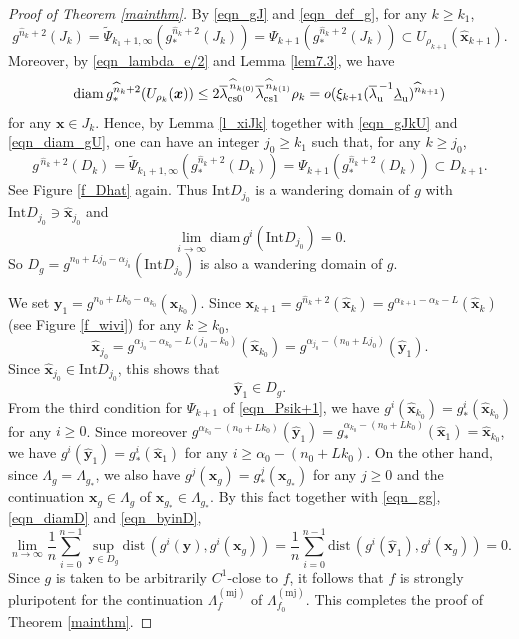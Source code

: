 \documentclass{amsart}
\theoremstyle{plain}
\theoremstyle{definition}
\numberwithin{equation}{section}
\numberwithin{figure}{section}
\def\bx{{\boldsymbol{x}}}
\def\by{{\boldsymbol{y}}}
\def\wh{\widehat}
\def\wt{\widetilde}
\def\ul{\underline}
\def\ol{\overline}
\def\ru{{\mathrm{u}}}
\begin{document}
\begin{proof}[Proof of Theorem \ref{mainthm}]
By \eqref{eqn_gJ} and \eqref{eqn_def_g}, for any $k\geq k_1$, 
\begin{equation}\label{eqn_gJkU}
g^{\wh n_k+2}(J_k)=\wt\varPsi_{k_1+1,\infty}(g_*^{\wh n_k+2}(J_k))=
\varPsi_{k+1}(g_*^{\wh n_k+2}(J_k))\subset  U_{\rho_{k+1}}(\wh\bx_{k+1}) .
\end{equation}
Moreover, by \eqref{eqn_lambda_e/2} and Lemma \ref{lem7.3}, we have  
\begin{equation}\label{eqn_diam_gU}
\mathrm{diam}\,g_*^{\wh n_k+2}(U_{\rho_k}(\bx))
\leq 2\ol\lambda_{\rm cs0}^{\,\widehat n_{k(0)}}\ol\lambda_{\rm cs1}^{\,\widehat n_{k(1)}}\rho_{k}
=o(\xi_{k+1}(\ol\lambda_{\ru}^{\,-1}\ul\lambda_{\ru})^{\wh n_{k+1}})
\end{equation}
for any $\bx\in J_k$.
Hence, by Lemma \ref{l_xiJk} together with \eqref{eqn_gJkU} and \eqref{eqn_diam_gU}, 
one can  have an integer $j_0\geq k_1$ such that, for any $k\geq j_0$,  
\[
g^{\,\wh n_k+2}(D_k)=\wt\varPsi_{k_1+1,\infty}(g_*^{\wh n_k+2}(D_k))
=\varPsi_{k+1}(g_*^{\wh n_k+2}(D_k))\subset D_{k+1}.
\]
See Figure \ref{f_Dhat} again.
Thus $\mathrm{Int}D_{j_0}$ is a wandering domain of $g$ 
with $\mathrm{Int}D_{j_0}\ni \wh\bx_{j_0}$ and 
\begin{equation}\label{eqn_diamD}
\lim_{i\to \infty}\mathrm{diam}\,g^i(\mathrm{Int}D_{j_0})=0.
\end{equation}
So $D_g=g^{n_0+Lj_0-\alpha_{j_0}}(\mathrm{Int}D_{j_0})$ is also a wandering domain of $g$.

We set $\by_1=g^{n_0+Lk_0-\alpha_{k_0}}(\wh\bx_{k_0})$.
Since $\bx_{k+1}=g^{\wh n_k+2}(\wh\bx_k)=g^{\alpha_{k+1}-\alpha_k-L}(\wh\bx_k)$  (see Figure \ref{f_wivi}) for any $k\geq k_0$, 
\[
\wh\bx_{j_0}
=g^{\alpha_{j_0}-\alpha_{k_0}-L(j_0-k_0)}(\wh \bx_{k_0})
=g^{\alpha_{j_0}-(n_0+Lj_0)}(\wh \by_1).
\]
Since $\wh\bx_{j_0}\in \mathrm{Int} D_{j_0}$, this shows that 
\begin{equation}\label{eqn_byinD}
\wh \by_1\in D_g.
\end{equation}
From the third condition for $\varPsi_{k+1}$ of \eqref{eqn_Psik+1}, we have $g^i(\wh\bx_{k_0})= g_*^i(\wh\bx_{k_0})$ for any $i\geq 0$.
Since moreover $g^{\alpha_{k_0}-(n_0+Lk_0)}(\wh\by_1)=g_*^{\alpha_{k_0}-(n_0+Lk_0)}(\wh\bx_1)=\wh\bx_{k_0}$, we have $g^i(\wh\by_1)=g_*^i(\wh\bx_1)$ for any $i\geq \alpha_0-(n_0+Lk_0)$.
On the other hand, since $\Lambda_{g}=\Lambda_{g_*}$, we also have $g^j(\bx_{g})=g_*^j(\bx_{g_*})$ 
for any $j\geq 0$ and the continuation $\bx_{g}\in \Lambda_{g}$ of $\bx_{g_*}\in \Lambda_{g_*}$.
By this fact together with \eqref{eqn_gg},\eqref{eqn_diamD} and \eqref{eqn_byinD},
\[
\lim _{n\to \infty} 
\frac{1}{n}\sum_{i=0}^{n-1}
\sup_{\by\in D_{g}}\mathrm{dist}\,(g^i(\by), g^i(\bx_{g}))=
\frac{1}{n}\sum_{i=0}^{n-1}
\mathrm{dist}\,(g^i(\wh\by_1), g^i(\bx_{g}))=0.
\]
Since $g$ is taken to be arbitrarily $C^1$-close to $f$, 
it follows that 
$f$ is strongly pluripotent for the continuation $\Lambda_f^{(\mathrm{mj})}$ 
of $\Lambda_{f_0}^{(\mathrm{mj})}$.
This completes the proof of Theorem \ref{mainthm}.
\end{proof}
\end{document}
